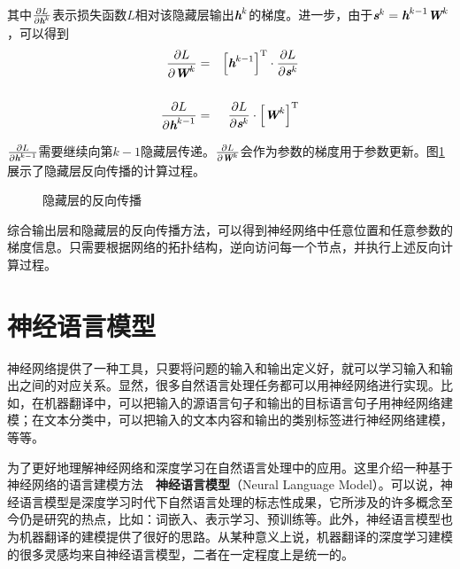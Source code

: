 \noindent  其中$ \frac{\partial L}{\partial {\textbf{\em h}}^k} $表示损失函数$ L $相对该隐藏层输出${\textbf{\em h}}^k $的梯度。进一步，由于$ {\textbf{\em s}}^k ={\textbf{\em h}}^{k-1}{\textbf{\em W}}^k$，可以得到
\begin{eqnarray}
\frac{\partial L}{\partial {\textbf{\em W}}^k}&=&{\left[{\textbf{\em h}}^{k-1}\right]}^{\textrm T}\cdot \frac{\partial L}{\partial {\textbf{\em s}}^k}\label{eq:9-55}\\ \nonumber\\
\frac{\partial L}{\partial {\textbf{\em h}}^{k-1}}&= &\frac{\partial L}{\partial {\textbf{\em s}}^k} \cdot {\left[{\textbf{\em W}}^k\right]}^{\textrm T}
\label{eq:9-56}
\end{eqnarray}

\parinterval  $ \frac{\partial L}{\partial {\textbf{\em h}}^{k-1}} $需要继续向第$ k-1 $隐藏层传递。$ \frac{\partial L}{\partial {\textbf{\em W}}^k} $会作为参数的梯度用于参数更新。图\ref{fig:9-57}展示了隐藏层反向传播的计算过程。

\begin{figure}[htp]
\centering

\caption{隐藏层的反向传播}
\label{fig:9-57}
\end{figure}

\parinterval  综合输出层和隐藏层的反向传播方法，可以得到神经网络中任意位置和任意参数的梯度信息。只需要根据网络的拓扑结构，逆向访问每一个节点，并执行上述反向计算过程。


\sectionnewpage
\section{神经语言模型}\label{sec9:nlm}

\parinterval  神经网络提供了一种工具，只要将问题的输入和输出定义好，就可以学习输入和输出之间的对应关系。显然，很多自然语言处理任务都可以用神经网络进行实现。比如，在机器翻译中，可以把输入的源语言句子和输出的目标语言句子用神经网络建模；在文本分类中，可以把输入的文本内容和输出的类别标签进行神经网络建模，等等。

\parinterval  为了更好地理解神经网络和深度学习在自然语言处理中的应用。这里介绍一种基于神经网络的语言建模方法\ \dash \ {\small\sffamily\bfseries{神经语言模型}}（Neural Language Model）。可以说，神经语言模型是深度学习时代下自然语言处理的标志性成果，它所涉及的许多概念至今仍是研究的热点，比如：词嵌入、表示学习、预训练等。此外，神经语言模型也为机器翻译的建模提供了很好的思路。从某种意义上说，机器翻译的深度学习建模的很多灵感均来自神经语言模型，二者在一定程度上是统一的。

